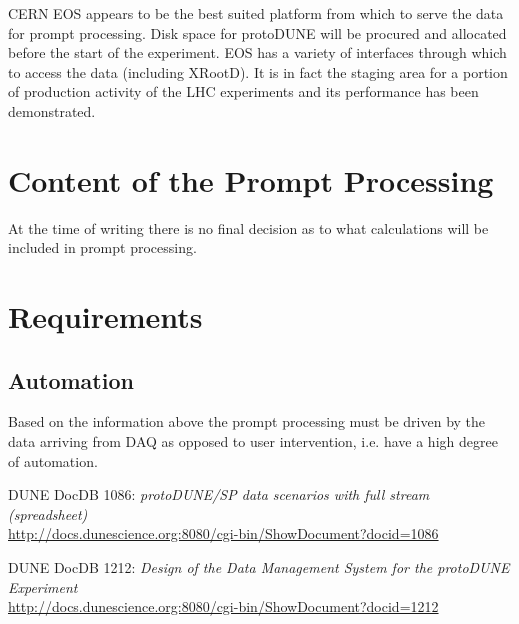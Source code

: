 \documentclass[pdftex,12pt,letter]{article}
\newcommand{\pd}{protoDUNE\xspace}
\begin{document}
CERN EOS appears to be the best suited platform from which to serve the data for prompt processing. Disk space for \pd will be procured and allocated
before the start of the experiment. EOS has a variety of interfaces through which to access the data (including XRootD). It is in fact the staging area
for a portion of production activity of the LHC experiments and its performance has been demonstrated.

\section{Content of the Prompt Processing}
At the time of writing there is no final decision as to what calculations will be included in prompt processing.

\section{Requirements}
\subsection{Automation}
Based on the information above the prompt processing must be driven by the data arriving from DAQ as opposed to user intervention, i.e. have a high degree
of automation.


\begin{thebibliography}{1}
{DUNE DocDB 1086: \textit{ protoDUNE/SP data scenarios with full stream (spreadsheet)}}\\
\url{http://docs.dunescience.org:8080/cgi-bin/ShowDocument?docid=1086}





{DUNE DocDB 1212: \textit{Design of the Data Management System for the protoDUNE Experiment}}\\
\url{http://docs.dunescience.org:8080/cgi-bin/ShowDocument?docid=1212}


\end{thebibliography}
\end{document}
